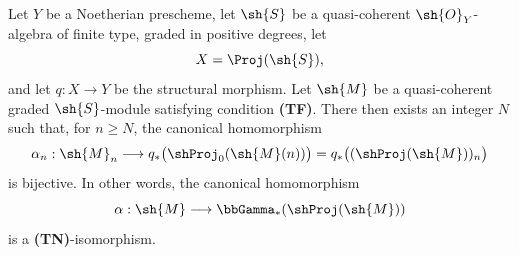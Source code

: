 \begin{theorem}[2.3.1]
\label{III.2.3.1}
Let $Y$ be a Noetherian prescheme, let $\sh{S}$ be a quasi-coherent $\sh{O}_Y$-algebra of finite type, graded in positive degrees, let
\[
  X=\Proj(\sh{S}),
\]
and let $q:X\to Y$ be the structural morphism.
Let $\sh{M}$ be a quasi-coherent graded $\sh{S}$-module satisfying condition \textbf{(TF)}.
There then exists an integer $N$ such that, for $n\geq N$, the canonical homomorphism 
\[
  \alpha_n:\sh{M}_n
  \longrightarrow q_*\bigl(\shProj_0(\sh{M}(n))\bigr)
  =q_*\bigl((\shProj(\sh{M}))_n\bigr)
\]
is bijective.
In other words, the canonical homomorphism
\[
  \alpha:\sh{M}\longrightarrow\bbGamma_*(\shProj(\sh{M}))
\]
is a \textbf{(TN)}-isomorphism.
\end{theorem}

